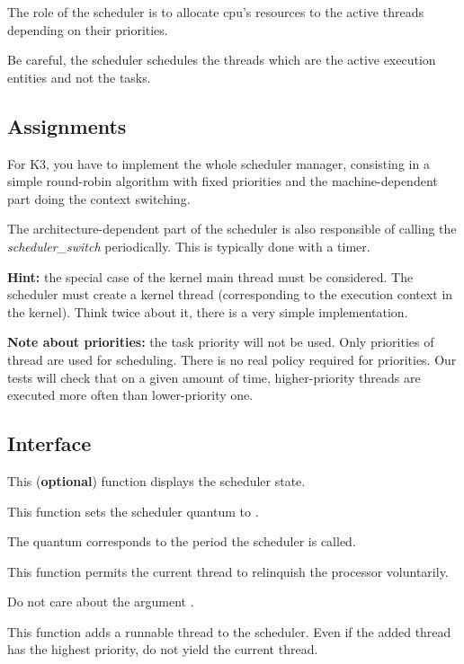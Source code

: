 The role of the scheduler is to allocate cpu's resources to the
active threads depending on their priorities.

Be careful, the scheduler schedules the threads which are the active
execution entities and not the tasks.

\subsection*{Assignments}

For K3, you have to implement the whole scheduler manager, consisting
in a simple round-robin algorithm with fixed priorities and the
machine-dependent part doing the context switching.

The architecture-dependent part of the scheduler is also
responsible of calling the \emph{scheduler\_switch} periodically. This
is typically done with a timer.

\textbf{Hint:} the special case of the kernel main thread must be
considered. The scheduler must create a kernel thread
(corresponding to the execution context in the kernel). Think
twice about it, there is a very simple implementation.

\textbf{Note about priorities:} the task priority will not be
used. Only priorities of thread are used for scheduling. There is
no real policy required for priorities. Our tests will check that
on a given amount of time, higher-priority threads are executed
more often than lower-priority one.

\subsection*{Interface}

{
  This (\textbf{optional}) function displays the scheduler state.
}

{
  This function sets the scheduler quantum to .

  The quantum corresponds to the period the scheduler is called.
}

{
  This function permits the current thread to relinquish
  the processor voluntarily.

  Do not care about the argument .
}

{
  This function adds a runnable thread to the scheduler. Even
  if the added thread has the highest priority, do not yield
  the current thread.
}

